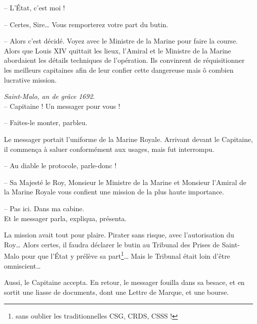 -- L'État, c'est moi !

-- Certes, Sire\ldots{} Vous remporterez votre part du butin.

-- Alors c'est décidé. Voyez avec le Ministre de la Marine pour faire
   la course.\\

Alors que Louis XIV quittait les lieux, l'Amiral et le Ministre de la
Marine abordaient les détails techniques de l'opération. Ils
convinrent de réquisitionner les meilleurs capitaines afin de leur
confier cette dangereuse mais ô combien lucrative mission.

\culdelampe{}

\textit{Saint-Malo, an de grâce 1692.}\\

-- Capitaine ! Un messager pour vous !

-- Faites-le monter, parbleu.

Le messager portait l'uniforme de la Marine Royale. Arrivant devant le
Capitaine, il commença à saluer conformément aux usages, mais fut
interrompu.

-- Au diable le protocole, parle-donc !

-- Sa Majesté le Roy, Monsieur le Ministre de la Marine et Monsieur
   l'Amiral de la Marine Royale vous confient une mission de la plus
   haute importance.

-- Pas ici. Dans ma cabine.\\

Et le messager parla, expliqua, présenta.

La mission avait tout pour plaire. Pirater sans risque, avec
l'autorisation du Roy\ldots{} Alors certes, il faudra déclarer le
butin au Tribunal des Prises de Saint-Malo pour que l'État y prélève
sa part\footnote{sans oublier les traditionnelles CSG, CRDS, CSSS
!}\ldots{} Mais le Tribunal était loin d'être omniscient\ldots{}

Aussi, le Capitaine accepta. En retour, le messager fouilla dans sa
besace, et en sortit une liasse de documents, dont une Lettre de
Marque, et une bourse.\\

